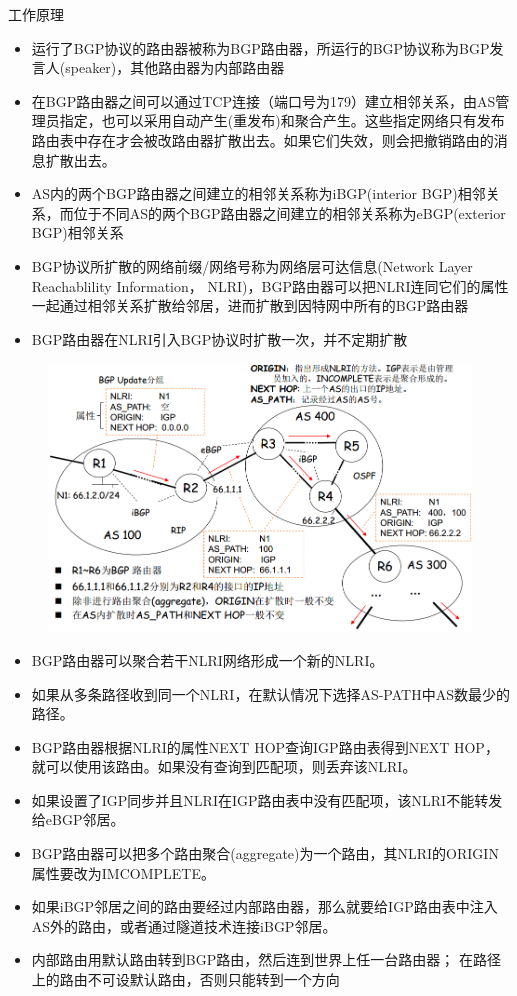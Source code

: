 \myhline
工作原理
\begin{itemize}
\item 运行了BGP协议的路由器被称为BGP路由器，所运行的BGP协议称为BGP发言人(speaker)，其他路由器为内部路由器
\item 在BGP路由器之间可以通过TCP连接（端口号为179）建立相邻关系，由AS管理员指定，也可以采用自动产生(重发布)和聚合产生。这些指定网络只有发布路由表中存在才会被改路由器扩散出去。如果它们失效，则会把撤销路由的消息扩散出去。
\item AS内的两个BGP路由器之间建立的相邻关系称为iBGP(interior BGP)相邻关系，而位于不同AS的两个BGP路由器之间建立的相邻关系称为eBGP(exterior BGP)相邻关系
\item  BGP协议所扩散的网络前缀/网络号称为网络层可达信息(Network Layer Reachablility Information， NLRI)，BGP路由器可以把NLRI连同它们的属性一起通过相邻关系扩散给邻居，进而扩散到因特网中所有的BGP路由器
\item BGP路由器在NLRI引入BGP协议时扩散一次，并不定期扩散
\end{itemize}
\begin{figure}[H]
	\centering
	\includegraphics[width=0.8\linewidth]{fig/NLRI.png}
\end{figure}

\begin{itemize}
\item BGP路由器可以聚合若干NLRI网络形成一个新的NLRI。
\item 如果从多条路径收到同一个NLRI，在默认情况下选择AS-PATH中AS数最少的路径。
\item BGP路由器根据NLRI的属性NEXT HOP查询IGP路由表得到NEXT HOP， 就可以使用该路由。如果没有查询到匹配项，则丢弃该NLRI。
\item 如果设置了IGP同步并且NLRI在IGP路由表中没有匹配项，该NLRI不能转发给eBGP邻居。
\item BGP路由器可以把多个路由聚合(aggregate)为一个路由，其NLRI的ORIGIN属性要改为IMCOMPLETE。
\item 如果iBGP邻居之间的路由要经过内部路由器，那么就要给IGP路由表中注入AS外的路由，或者通过隧道技术连接iBGP邻居。
\item 内部路由用默认路由转到BGP路由，然后连到世界上任一台路由器；
在路径上的路由不可设默认路由，否则只能转到一个方向
\end{itemize}

